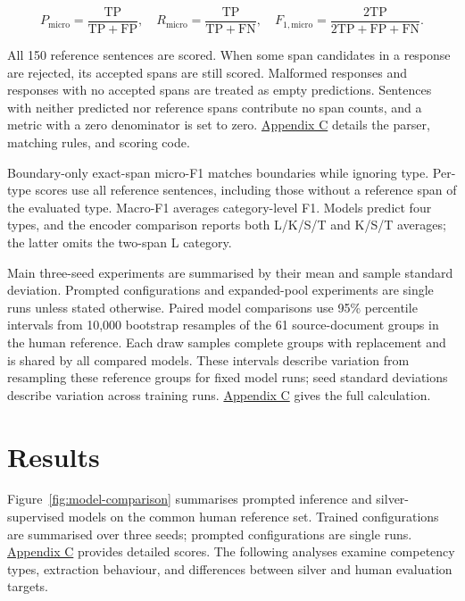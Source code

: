 \begin{equation}
P_{\mathrm{micro}}=\frac{\mathrm{TP}}{\mathrm{TP}+\mathrm{FP}},
\quad R_{\mathrm{micro}}=\frac{\mathrm{TP}}{\mathrm{TP}+\mathrm{FN}},
\quad F_{1,\mathrm{micro}}=\frac{2\mathrm{TP}}{2\mathrm{TP}+\mathrm{FP}+\mathrm{FN}}.
\label{eq:micro-prf}
\end{equation}

All 150 reference sentences are scored. When some span candidates in a response are rejected, its accepted spans are still scored. Malformed responses and responses with no accepted spans are treated as empty predictions. Sentences with neither predicted nor reference spans contribute no span counts, and a metric with a zero denominator is set to zero. \hyperref[app:c]{Appendix C} details the parser, matching rules, and scoring code.

Boundary-only exact-span micro-F1 matches boundaries while ignoring type. Per-type scores use all reference sentences, including those without a reference span of the evaluated type. Macro-F1 averages category-level F1. Models predict four types, and the encoder comparison reports both L/K/S/T and K/S/T averages; the latter omits the two-span L category.

Main three-seed experiments are summarised by their mean and sample standard deviation. Prompted configurations and expanded-pool experiments are single runs unless stated otherwise. Paired model comparisons use 95\% percentile intervals from 10,000 bootstrap resamples of the 61 source-document groups in the human reference. Each draw samples complete groups with replacement and is shared by all compared models. These intervals describe variation from resampling these reference groups for fixed model runs; seed standard deviations describe variation across training runs. \hyperref[app:c]{Appendix C} gives the full calculation.


\section{Results}
\label{sec:results-r12}

Figure~\ref{fig:model-comparison} summarises prompted inference and silver-supervised models on the common human reference set. Trained configurations are summarised over three seeds; prompted configurations are single runs. \hyperref[app:c]{Appendix C} provides detailed scores. The following analyses examine competency types, extraction behaviour, and differences between silver and human evaluation targets.

